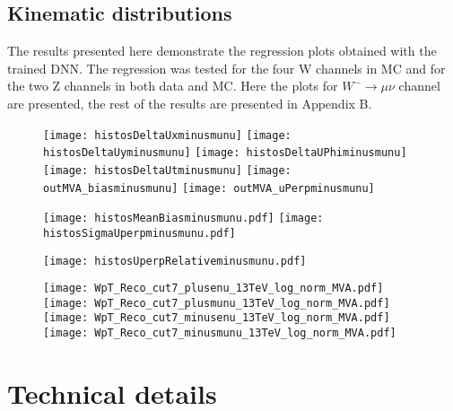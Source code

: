 \subsection{Kinematic distributions} 
The results presented here demonstrate the regression plots obtained with the trained DNN. The regression was tested for the four W channels in MC and for the two Z channels in both data and MC. Here the plots for $W^-\rightarrow \mu \nu$ channel are presented, the rest of the results are presented in Appendix B.
	\begin{figure}[tph]
	\centering
	\texttt{[image: histosDeltaUxminusmunu]}%
	\texttt{[image: histosDeltaUyminusmunu]}
	\texttt{[image: histosDeltaUPhiminusmunu]}%
	\texttt{[image: histosDeltaUtminusmunu]}
	\texttt{[image: outMVA\_biasminusmunu]}%
	\texttt{[image: outMVA\_uPerpminusmunu]}
	\caption{}
	\label{fig:mu13}
\end{figure}

	\begin{figure}[tph]
	\centering
	\texttt{[image: histosMeanBiasminusmunu.pdf]}%
	\texttt{[image: histosSigmaUperpminusmunu.pdf]}
	\caption{}
	\label{fig:mu13}
\end{figure}

	\begin{figure}[tph]
	\centering
	\texttt{[image: histosUperpRelativeminusmunu.pdf]}%
	\caption{}
	\label{fig:mu13}
\end{figure}

	\begin{figure}[tph]
	\centering
	\texttt{[image: WpT\_Reco\_cut7\_plusenu\_13TeV\_log\_norm\_MVA.pdf]}%
	\texttt{[image: WpT\_Reco\_cut7\_plusmunu\_13TeV\_log\_norm\_MVA.pdf]}
	\texttt{[image: WpT\_Reco\_cut7\_minusenu\_13TeV\_log\_norm\_MVA.pdf]}%
	\texttt{[image: WpT\_Reco\_cut7\_minusmunu\_13TeV\_log\_norm\_MVA.pdf]}
	\caption{}
	\label{fig:mu13}
\end{figure}

\section{Technical details}
